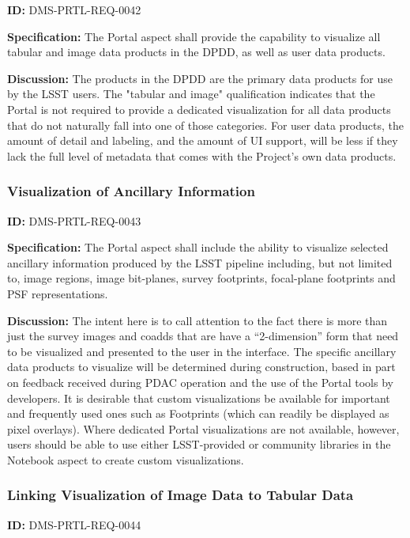 \documentclass[SE,toc,lsstdraft]{lsstdoc}
\begin{document}
\label{DMS-PRTL-REQ-0042}
\textbf{ID:} DMS-PRTL-REQ-0042

\textbf{Specification:}
The Portal aspect shall provide the capability to visualize all tabular and image data products in the DPDD, as well as user data products.

\textbf{Discussion:}
The products in the DPDD are the primary data products for use by the LSST users.  The "tabular and image" qualification indicates that the Portal is not required to provide a dedicated visualization for all data products that do not naturally fall into one of those categories.
For user data products, the amount of detail and labeling, and the amount of UI support, will be less if they lack the full level of metadata that comes with the Project's own data products.

\subsubsection{Visualization of Ancillary Information}

\label{DMS-PRTL-REQ-0043}
\textbf{ID:} DMS-PRTL-REQ-0043

\textbf{Specification:}
The Portal aspect shall include the ability to visualize selected ancillary information produced by the LSST pipeline including, but not limited to, image regions, image bit-planes, survey footprints, focal-plane footprints and PSF representations.

\textbf{Discussion:}
The intent here is to call attention to the fact there is more than just the survey images and coadds that are have a “2-dimension” form that need to be visualized and presented to the user in the interface.
The specific ancillary data products to visualize will be determined during construction, based in part on feedback received during PDAC operation and the use of the Portal tools by developers.
It is desirable that custom visualizations be available for important and frequently used ones such as Footprints (which can readily be displayed as pixel overlays).  Where dedicated Portal visualizations are not available, however, users should be able to use either LSST-provided or community libraries in the Notebook aspect to create custom visualizations.

\subsubsection{Linking Visualization of Image Data to Tabular Data}

\label{DMS-PRTL-REQ-0044}
\textbf{ID:} DMS-PRTL-REQ-0044
\end{document}
